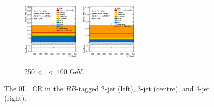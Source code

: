 \begin{figure}[h!]
\begin{subfigure}[b]{\textwidth}
        \includegraphics[width=0.32\textwidth]{Images/VH/Own_fit/prefit_VHbb/Region_distpTV_BMax400_BMin250_DCRHigh_J3_TTypebb_T2_L0_Y6051_Prefit.png}
        \includegraphics[width=0.32\textwidth]{Images/VH/Own_fit/prefit_VHbb/Region_distpTV_BMax400_BMin250_DCRHigh_J4_TTypebb_T2_L0_Y6051_Prefit.png}
        \caption{250 < \ptv\ < 400 GeV.}
        \label{fig:plots_VHbb_OL_250_CRH}
    \end{subfigure}
    \caption{The 0L \highdr\ CR in the $BB$-tagged 2-jet (left), 3-jet (centre), and 4-jet (right).}
    \label{fig:plots_VHbb_OL_CRH}
\end{figure} 

\vspace*{\fill} 

